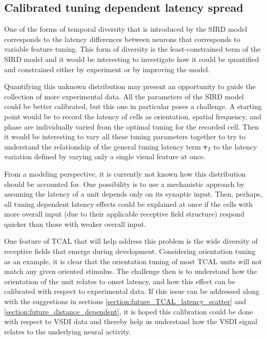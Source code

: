 \documentclass[phd,ianc,twoside]{infthesis}
\begin{document}
\subsection{Calibrated tuning dependent latency spread}
\label{section:future_SIRD_tuning}

One of the forms of temporal diversity that is introduced by the SIRD
model corresponds to the latency differences between neurons that
corresponds to variable feature tuning. This form of diversity is the
least-constrained term of 
the SIRD model and it would be interesting to investigate how it could be
quantified and constrained either by experiment or by improving the model.

Quantifying this unknown distribution may present an opportunity to guide the
collection of more experimental data. All the parameters of the SIRD
model could be better calibrated, but this one in particular poses a
challenge. A starting point would be to record the latency of cells as
orientation, spatial frequency, and phase are individually varied from the optimal
tuning for the recorded cell. Then it would be interesting to vary all these
tuning parameters together to try to understand the relationship of the
general tuning latency term $\pmb{\tau}_T$ to the latency variation
defined by varying only a single visual feature at once.

From a modeling perspective, it is currently not known how this
distribution should be accounted for.  One possibility is to use a
mechanistic approach by 
assuming the latency of a unit depends only on its synaptic input. Then, perhaps, all
tuning dependent latency effects could be explained at once if the
cells with more overall input (due to their applicable receptive field structure)
respond quicker than those with weaker overall input.

One feature of TCAL that will help address this problem is the wide diversity of
receptive fields that emerge during development. Considering
orientation tuning as an example, it is clear 
that the orientation tuning of most TCAL units will not match any given
oriented stimulus. The challenge then is to understand how the
orientation of the unit relates to onset latency, and how this
effect can be calibrated with respect to experimental data. If this issue can
be addressed along with the suggestions in sections
\ref{section:future_TCAL_latency_scatter} and
\ref{section:future_distance_dependent}, it is hoped this calibration
could be done with respect to VSDI data and thereby help us understand
how the VSDI signal relates to the underlying neural activity.
\end{document}
